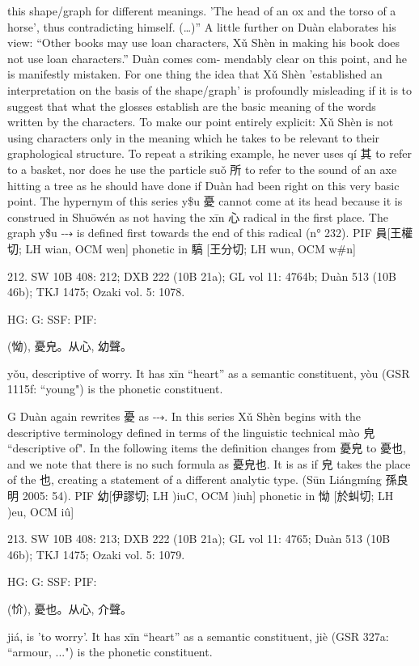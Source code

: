 {this shape/graph for different meanings. 'The head of an ox and the torso of a horse', thus contradicting himself. (…)'' A little further on Duàn elaborates his view: ``Other books may use loan characters, Xǔ Shèn in making his book does not use loan characters.'' Duàn comes com- mendably clear on this point, and he is manifestly mistaken. For one thing the idea that Xǔ Shèn 'established an interpretation on the basis of the shape/graph' is profoundly misleading if it is to suggest that what the glosses establish are the basic meaning of the words written by the characters. To make our point entirely explicit: Xǔ Shèn is not using characters only in the meaning which he takes to be relevant to their graphological structure. To repeat a striking example, he never uses qí 其 to refer to a basket, nor does he use the particle suǒ 所 to refer to the sound of an axe hitting a tree as he should have done if Duàn had been right on this very basic point.
    The hypernym of this series y\$u 憂 cannot come at its head because it is construed in Shuōwén as not having the xīn 心 radical in the first place. The graph y\$u ⤏ is defined first towards the end of this radical (n° 232).
PIF    員[王權切; LH wian, OCM wen] phonetic in 䮦 [王分切; LH wun, OCM w\#n]

212. SW 10B 408: 212; DXB 222 (10B 21a); GL vol 11: 4764b; Duàn 513 (10B 46b); TKJ 1475; Ozaki vol. 5: 1078.


HG:
G: SSF: PIF:

(怮),
憂皃。从心, 幼聲。

yǒu,
descriptive of worry.
It has xīn ``heart'' as a semantic constituent,
yòu (GSR 1115f: ``young") is the phonetic constituent.

G    Duàn again rewrites 憂 as ⤏.
    In this series Xǔ Shèn begins with the descriptive terminology defined in terms of the linguistic technical mào 皃 ``descriptive of". In the following items the definition changes from 憂皃 to 憂也, and we note that there is no such formula as 憂皃也. It is as if 皃 takes the place of the 也, creating a statement of a different analytic type. (Sūn Liángmíng 孫良明 2005: 54).
PIF     幼[伊謬切; LH )iuC, OCM )iuh] phonetic in 怮 [於虯切; LH )eu, OCM iû]

213. SW 10B 408: 213; DXB 222 (10B 21a); GL vol 11: 4765; Duàn 513 (10B 46b); TKJ 1475; Ozaki vol. 5: 1079.


HG:
G: SSF: PIF:

(忦),
憂也。从心, 介聲。

jiá,
is 'to worry'.
It has xīn ``heart'' as a semantic constituent,
jiè (GSR 327a: ``armour, ...") is the phonetic constituent.



}
